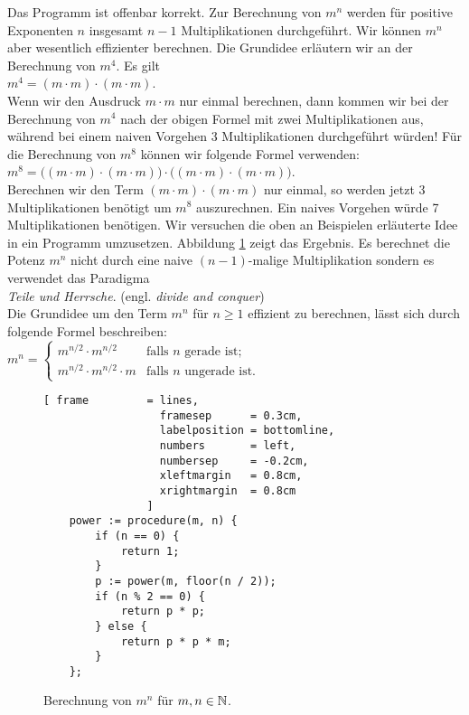 Das Programm ist  offenbar korrekt.
Zur Berechnung  von $m^n$ werden f\"ur positive Exponenten $n$ insgesamt $n-1$ Multiplikationen durchgef\"uhrt.
Wir k\"onnen $m^n$ aber wesentlich effizienter berechnen.  Die Grundidee erl\"autern wir an
der Berechnung von $m^4$.  Es gilt \\[0.1cm]
\hspace*{1.3cm} 
$m^4 = (m \cdot m) \cdot (m \cdot m)$.\\[0.1cm]
Wenn wir den Ausdruck $m\cdot m$ nur einmal berechnen, dann kommen wir bei der Berechnung von
$m^4$ nach der obigen Formel mit zwei Multiplikationen aus, w\"ahrend bei einem
naiven Vorgehen 3 Multiplikationen durchgef\"uhrt w\"urden! F\"ur die Berechnung von $m^8$
k\"onnen wir folgende Formel verwenden: \\[0.1cm]
\hspace*{1.3cm} 
$m^8 = \bigl( (m \cdot m) \cdot (m \cdot m) \bigr) \cdot \bigl( (m \cdot m) \cdot (m \cdot m) \bigr)$. \\[0.1cm]
Berechnen wir den Term $(m \cdot m) \cdot (m \cdot m)$ nur einmal, so werden jetzt 3 Multiplikationen
ben\"otigt um $m^8$ auszurechnen.  Ein naives Vorgehen w\"urde 7 Multiplikationen ben\"otigen.
Wir versuchen die oben an Beispielen erl\"auterte Idee in ein Programm umzusetzen.
Abbildung \ref{fig:power.stlx} zeigt das Ergebnis.  Es berechnet die Potenz $m^n$ nicht durch eine
naive $(n-1)$-malige Multiplikation sondern es verwendet das Paradigma \\[0.1cm]
\hspace*{1.3cm} \emph{Teile und Herrsche}. \quad (engl. \emph{divide and conquer})
\\[0.1cm]
Die Grundidee um den Term $m^n$ f\"ur $n \geq 1$ effizient zu berechnen,
l\"asst sich durch folgende Formel beschreiben: \\[0.1cm] 
\hspace*{1.3cm} 
$m^n = 
\left\{\begin{array}{ll}
m^{n/2} \cdot m^{n/2}      & \mbox{falls $n$ gerade ist};    \\
m^{n/2} \cdot m^{n/2} \cdot m  & \mbox{falls $n$ ungerade ist}.
\end{array}
\right.
$


\begin{figure}[!h]
  \centering
\begin{Verbatim}[ frame         = lines, 
                  framesep      = 0.3cm, 
                  labelposition = bottomline,
                  numbers       = left,
                  numbersep     = -0.2cm,
                  xleftmargin   = 0.8cm,
                  xrightmargin  = 0.8cm
                ]
    power := procedure(m, n) {
        if (n == 0) {
            return 1;
        }
        p := power(m, floor(n / 2));
        if (n % 2 == 0) {
            return p * p;
        } else {
            return p * p * m;
        }
    };
\end{Verbatim}
\vspace*{-0.3cm}
  \caption{Berechnung von $m^n$ f\"ur $m,n \in {\mathbb N}$.}
  \label{fig:power.stlx}
\end{figure} 

